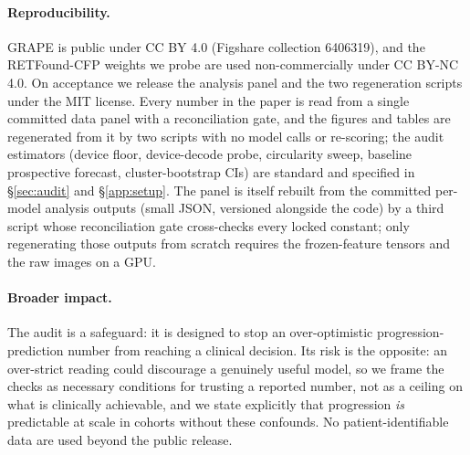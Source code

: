 \paragraph{Reproducibility.} GRAPE is public under CC BY 4.0 (Figshare collection 6406319), and the RETFound-CFP weights
we probe are used non-commercially under CC BY-NC 4.0. On acceptance we release the analysis panel and the two
regeneration scripts under the MIT license. Every number in the paper is read from a
single committed data panel with a reconciliation gate, and the figures and tables are regenerated from it by two
scripts with no model calls or re-scoring; the audit estimators (device floor, device-decode probe, circularity sweep,
baseline prospective forecast, cluster-bootstrap CIs) are standard and specified in \S\ref{sec:audit} and \S\ref{app:setup}.
The panel is itself rebuilt from the committed per-model analysis outputs (small JSON, versioned alongside the code) by a
third script whose reconciliation gate cross-checks every locked constant; only regenerating those outputs from scratch
requires the frozen-feature tensors and the raw images on a GPU.

\paragraph{Broader impact.} The audit is a safeguard: it is designed to stop an over-optimistic progression-prediction
number from reaching a clinical decision. Its risk is the opposite: an over-strict reading could discourage a genuinely
useful model, so we frame the checks as necessary conditions for trusting a reported number, not as a ceiling on what
is clinically achievable, and we state explicitly that progression \emph{is} predictable at scale in cohorts without
these confounds. No patient-identifiable data are used beyond the public release.
